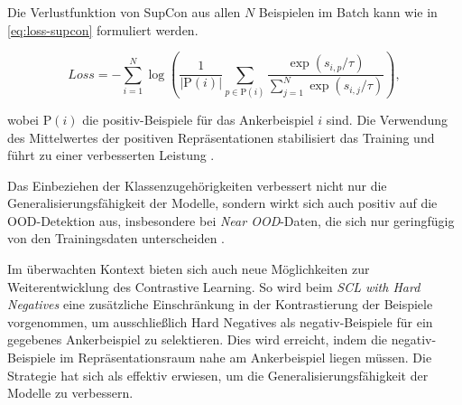 Die Verlustfunktion von SupCon aus allen $N$ Beispielen im Batch kann wie in \autoref{eq:loss-supcon} formuliert werden.

\begin{equation}
	Loss = - \sum_{i=1}^{N} \log \left( \frac{1}{|\text{P}(i)|} \sum_{p \in \text{P}(i)} \frac{\exp(s_{i,p}/\tau)}{\sum_{j=1}^{N} \exp(s_{i,j}/\tau)} \right),
	\label{eq:loss-supcon}
\end{equation} %

wobei $\text{P}(i)$ die positiv-Beispiele für das Ankerbeispiel $i$ sind. Die Verwendung des Mittelwertes der positiven Repräsentationen stabilisiert das Training und führt zu einer verbesserten Leistung \parencite{Khosla2021supcon}.

Das Einbeziehen der Klassenzugehörigkeiten verbessert nicht nur die Generalisierungsfähigkeit der Modelle, sondern wirkt sich auch positiv auf die OOD-Detektion aus, insbesondere bei \emph{Near OOD}-Daten, die sich nur geringfügig von den Trainingsdaten unterscheiden \parencite{Keshtmand2022contrastood}.


Im überwachten Kontext bieten sich auch neue Möglichkeiten zur Weiterentwicklung des Contrastive Learning. So wird beim \emph{SCL with Hard Negatives} \parencite{Jiang2024supconhardnegatives} eine zusätzliche Einschränkung in der Kontrastierung der Beispiele vorgenommen, um ausschließlich Hard Negatives als negativ-Beispiele für ein gegebenes Ankerbeispiel zu selektieren. Dies wird erreicht, indem die negativ-Beispiele im Repräsentationsraum nahe am Ankerbeispiel liegen müssen. Die Strategie hat sich als effektiv erwiesen, um die Generalisierungsfähigkeit der Modelle zu verbessern.

